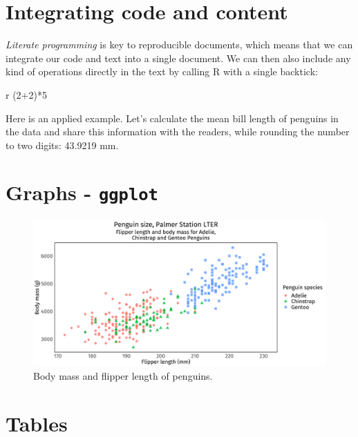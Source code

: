 \documentclass[
  11pt,
]{scrartcl}
\newenvironment{Shaded}{\begin{snugshade}}{\end{snugshade}}
\newcommand{\AttributeTok}[1]{\textcolor[rgb]{0.77,0.63,0.00}{#1}}
\newcommand{\StringTok}[1]{\textcolor[rgb]{0.31,0.60,0.02}{#1}}
\begin{document}
\hypertarget{integrating-code-and-content}{%
\section{Integrating code and content}\label{integrating-code-and-content}}

\emph{Literate programming} is key to reproducible documents, which means that we can integrate our code and text into a single document. We can then also include any kind of operations directly in the text by calling R with a single backtick:

\begin{Shaded}
\begin{Highlighting}[]
\StringTok{\textasciigrave{}}\AttributeTok{r (2+2)*5}\StringTok{\textasciigrave{}}
\end{Highlighting}
\end{Shaded}

Here is an applied example. Let's calculate the mean bill length of penguins in the data and share this information with the readers, while rounding the number to two digits: 43.9219 mm.

\newpage

\hypertarget{graphs---ggplot}{%
\section{\texorpdfstring{Graphs - \texttt{ggplot}}{Graphs - ggplot}}\label{graphs---ggplot}}

\begin{figure}

{\centering \includegraphics[width=0.9\linewidth]{figs/figggplot-1} 

}

\caption{Body mass and flipper length of penguins.}\label{fig:ggplot}
\end{figure}

\hypertarget{tables}{%
\section{Tables}\label{tables}}
\end{document}
